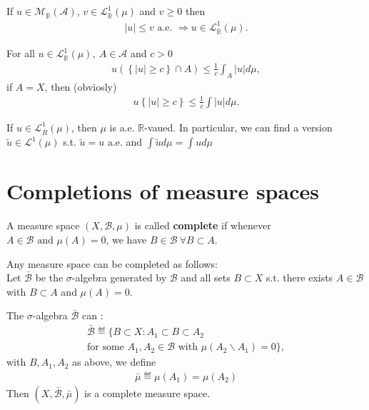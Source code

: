 \begin{corollary}
    If \(u\in\mathcal{M}_{\overline{\mathbb{R}}}(\mathscr{A})\), \(v\in\mathcal{L}^{1}_{\overline{\mathbb{R}}}(\mu)\) and \(v\geq0\) then
    \begin{align*}
        \vert u\vert \leq v \text{ a.e. } \Rightarrow u\in\mathcal{L}^{1}_{\overline{\mathbb{R}}}(\mu).
    \end{align*}
\end{corollary}
\begin{proposition}
    For all \(u\in\mathcal{L}^{1}_{\overline{\mathbb{R}}}(\mu), \ A\in\mathscr{A}\) and \(c>0\)
    \begin{align*}
        u\left(\left\{ \vert u\vert \geq c \right\} \cap A\right) \leq \frac{1}{c}\int_{A}\vert u\vert d\mu,
    \end{align*}
    if \(A=X\), then (obviosly)
    \begin{align*}
        u\left\{ \vert u\vert \geq c \right\} \leq \frac{1}{c}\int \vert u\vert d\mu.
    \end{align*}
\end{proposition}    
\ifdetailed
\begin{corollary}
    If \(u\in\mathcal{L}^{1}_{\overline{R}}(\mu)\), then \(\mu\) is a.e. \(\mathbb{R}\)-vaued. In particular, we can find a version
    \(\tilde{u}\in \mathcal{L}^{1}(\mu)\) s.t. \(\tilde{u}=u\) a.e. and \(\int\tilde{u}d\mu = \int ud\mu\)
\end{corollary}
\fi

\section*{Completions of measure spaces}
\begin{definition}
    A measure space \(\left(X,\mathscr{B}, \mu\right)\) is called \textbf{complete} if whenever \(A\in\mathscr{B} \text{ and } \mu(A) =0\), we have \(B\in\mathscr{B} \ \forall B\subset A\).
\end{definition}
\begin{remark}
    Any measure space can be completed as follows: \\ 
    Let \(\bar{\mathscr{B}}\) be the \(\sigma\)-algebra generated by \(\mathscr{B}\) and all sets \(B\subset X\) s.t. there exists \(A\in\mathscr{B}\)
    with \(B\subset A\) and \(\mu(A)=0\).
\end{remark}
\begin{proposition}
    The \(\sigma\)-algebra \(\bar{\mathscr{B}}\) can :
    \begin{align*}
        \bar{\mathscr{B}} \eqdef \Biggl\{ B\subset X: A_1\subset B\subset A_2\\ \text{for some }A_1,A_2\in\mathscr{B}\text{ with }\mu(A_2\backslash A_1)=0 \Biggr\},
    \end{align*}
    with \(B,A_1,A_2 \) as above, we define 
    \begin{align*}
        \bar{\mu} \eqdef \mu(A_1) = \mu(A_2)
    \end{align*}
    Then \(\left( X,\bar{\mathscr{B}}, \bar{\mu} \right)\) is a complete measure space.
\end{proposition}

